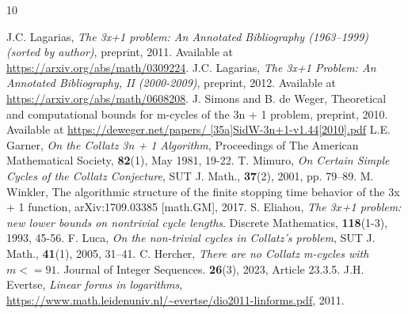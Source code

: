 \documentclass{amsart}
\theoremstyle{definition}
\theoremstyle{remark}
\numberwithin{equation}{section}
\begin{document}

\begin{thebibliography}{10}
	
	 J.C. Lagarias, \textit{The 3x+1 problem: An Annotated Bibliography (1963–1999) (sorted	by author)}, preprint, 2011. Available at \url{https://arxiv.org/abs/math/0309224}.
	 J.C. Lagarias, \textit{The 3x+1 Problem: An Annotated Bibliography, II (2000-2009)}, preprint, 2012. Available at \url{https://arxiv.org/abs/math/0608208}.
	 J. Simons and B. de Weger, Theoretical and computational bounds for m-cycles
	of the 3n + 1 problem, preprint, 2010. Available at \url{https://deweger.net/papers/
	[35a]SidW-3n+1-v1.44[2010].pdf}
	 L.E. Garner, \textit{On the Collatz 3n + 1 Algorithm}, Proceedings of The American Mathematical Society,  \textbf{82}(1), May 1981, 19-22.
	 T. Mimuro, \textit{On Certain Simple Cycles of the Collatz Conjecture}, SUT J. Math., \textbf{37}(2), 2001, pp. 79–89.
	 M. Winkler, The algorithmic structure of the finite stopping time behavior of the 3x + 1 function, arXiv:1709.03385 [math.GM], 2017.
	 S. Eliahou, \textit{The 3$x$+1 problem: new lower bounds on nontrivial cycle lengths}. Discrete Mathematics, \textbf{118}(1-3), 1993, 45-56.
	 F. Luca, \textit{On the non-trivial cycles in Collatz’s problem}, SUT J. Math., \textbf{41}(1), 2005, 31–41.
	 C. Hercher, \textit{There are no Collatz m-cycles with $m<=91$}. Journal of Integer Sequences. \textbf{26}(3), 2023, Article 23.3.5.
	 J.H. Evertse, \textit{Linear forms in logarithms}, \url{https://www.math.leidenuniv.nl/~evertse/dio2011-linforms.pdf}, 2011.

	
	
\end{thebibliography}


%
\end{document}
